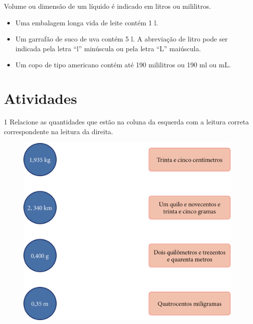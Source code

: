 {

Volume ou dimensão de um líquido é indicado em litros ou mililitros. 

\begin{itemize}
  \item Uma embalagem longa vida de leite contém 1 l.
  \item Um garrafão de suco de uva contém 5 l. A abreviação de litro pode ser indicada pela letra ``l'' minúscula ou pela letra ``L'' maiúscula. 
  \item Um copo de tipo americano contém até 190 mililitros ou 190 ml ou mL.
\end{itemize}

  }

\section*{Atividades}

\num{1} Relacione as quantidades que estão na coluna da esquerda com a leitura correta
correspondente na leitura da direita.

\begin{figure}[htpb!]
\centering
\includegraphics[width=.5\textwidth]{media/image20.png}
\end{figure}


